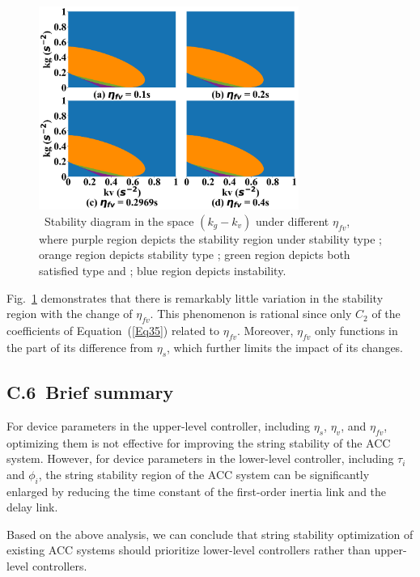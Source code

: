 \documentclass[journal]{IEEEtran}
\begin{document}
\begin{figure}
  \centering
  \includegraphics[width=8.5cm]{figs/fig12.png}
  \caption{~Stability diagram in the space $(k_g-k_v)$ under different $\eta_{fv}$, where purple region depicts the stability region under stability type \uppercase\expandafter{}; orange region depicts stability type \uppercase\expandafter{}; green region depicts both satisfied type \uppercase\expandafter{} and \uppercase\expandafter{}; blue region depicts instability.}
  \label{fig12}
\end{figure}

Fig.~\ref{fig12} demonstrates that there is remarkably little variation in the stability region with the change of $\eta_{fv}$. This phenomenon is rational since only $C_2$ of the coefficients of Equation~(\ref{Eq35}) related to $\eta_{fv}$. Moreover, $\eta_{fv}$ only functions in the part of its difference from $\eta_s$, which further limits the impact of its changes.

\subsection*{C.6~Brief summary}

For device parameters in the upper-level controller, including $\eta_s$, $\eta_v$, and $\eta_{fv}$, optimizing them is not effective for improving the string stability of the ACC system. However, for device parameters in the lower-level controller, including $\tau_i$ and $\phi_i$, the string stability region of the ACC system can be significantly enlarged by reducing the time constant of the first-order inertia link and the delay link.

Based on the above analysis, we can conclude that string stability optimization of existing ACC systems should prioritize lower-level controllers rather than upper-level controllers.
\end{document}
